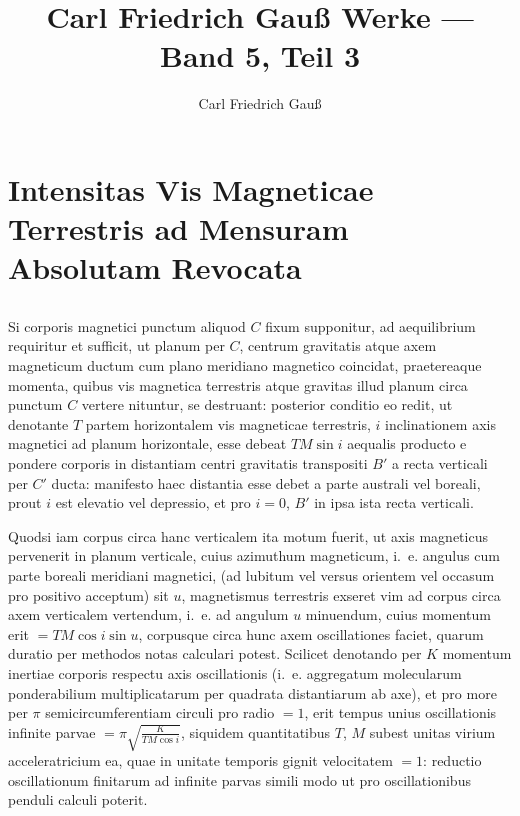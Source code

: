 \documentclass[fontsize=11pt,paper=a4,twoside,openany]{scrbook}
\title{Carl Friedrich Gauß Werke --- Band 5, Teil 3}
\author{Carl Friedrich Gauß}
\date{}
\begin{document}
\maketitle


\chapter*{Intensitas Vis Magneticae Terrestris ad Mensuram Absolutam Revocata}

\setcounter{section}{6}
\section{}

Si corporis magnetici punctum aliquod $C$ fixum supponitur, ad aequilibrium requiritur et sufficit, ut planum per $C$, centrum gravitatis atque axem magneticum ductum cum plano meridiano magnetico coincidat, praetereaque momenta, quibus vis magnetica terrestris atque gravitas illud planum circa punctum $C$ vertere nituntur, se destruant: posterior conditio eo redit, ut denotante $T$ partem horizontalem vis magneticae terrestris, $i$ inclinationem axis magnetici ad planum horizontale, esse debeat $TM\sin i$ aequalis producto e pondere corporis in distantiam centri gravitatis transpositi $B'$ a recta verticali per $C'$ ducta: manifesto haec distantia esse debet a parte australi vel boreali, prout $i$ est elevatio vel depressio, et pro $i=0$, $B'$ in ipsa ista recta verticali.

Quodsi iam corpus circa hanc verticalem ita motum fuerit, ut axis magneticus pervenerit in planum verticale, cuius azimuthum magneticum, i.~e. angulus cum parte boreali meridiani magnetici, (ad lubitum vel versus orientem vel occasum pro positivo acceptum) sit $u$, magnetismus terrestris exseret vim ad corpus circa axem verticalem vertendum, i.~e. ad angulum $u$ minuendum, cuius momentum erit $=TM\cos i\sin u$, corpusque circa hunc axem oscillationes faciet, quarum duratio per methodos notas calculari potest. Scilicet denotando per $K$ momentum inertiae corporis respectu axis oscillationis (i.~e. aggregatum molecularum ponderabilium multiplicatarum per quadrata distantiarum ab axe), et pro more per $\pi$ semicircumferentiam circuli pro radio $=1$, erit tempus unius oscillationis infinite parvae $=\pi\sqrt{\frac{K}{TM\cos i}}$, siquidem quantitatibus $T$, $M$ subest unitas virium acceleratricium ea, quae in unitate temporis gignit velocitatem $=1$: reductio oscillationum finitarum ad infinite parvas simili modo ut pro oscillationibus penduli calculi poterit.
\end{document}
